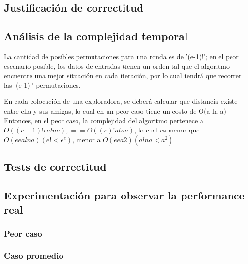 \subsection{Justificación de correctitud}

\subsection{Análisis de la complejidad temporal}
La cantidad de posibles permutaciones para una ronda es de '(e-1)!'; en el peor escenario posible, los datos de entradas tienen un orden tal que el algoritmo encuentre una mejor situación en cada iteración, por lo cual tendrá que recorrer las '(e-1)!' permutaciones. 

En cada colocación de una exploradora, se deberá calcular que distancia existe entre ella y sus amigas, lo cual en un peor caso tiene un costo de O(a ln a)
Entonces, en el peor caso, la complejidad del algoritmo pertenece a $O( (e-1)! e a ln a), == O( (e)! a ln a)$,   lo cual es menor que $O(ee a lna) (e! < e^e)$, menor a  $O(ee a2) (a ln a < a^2)$

\subsection{Tests de correctitud}

\subsection{Experimentación para observar la performance real}

\subsubsection{Peor caso}

\subsubsection{Caso promedio}
